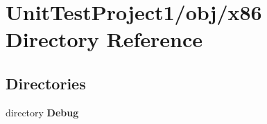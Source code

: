 \section{Unit\+Test\+Project1/obj/x86 Directory Reference}
\label{dir_9ad076ff540d15ae484a81844df7b920}
\subsection*{Directories}
\begin{DoxyCompactItemize}
\item 
directory \textbf{ Debug}
\end{DoxyCompactItemize}

